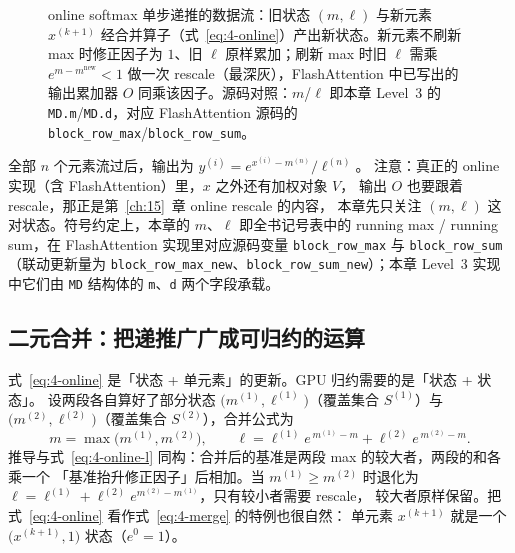 \begin{figure}[htbp]
\caption{online softmax 单步递推的数据流：旧状态 $(m,\ell)$ 与新元素 $x^{(k+1)}$ 经合并算子（式~\ref{eq:4-online}）产出新状态。新元素不刷新 max 时修正因子为 $1$、旧 $\ell$ 原样累加；刷新 max 时旧 $\ell$ 需乘 $e^{m-m^{\mathrm{new}}} < 1$ 做一次 rescale（最深灰），FlashAttention 中已写出的输出累加器 $O$ 同乘该因子。源码对照：$m$/$\ell$ 即本章 Level~3 的 \texttt{MD.m}/\texttt{MD.d}，对应 FlashAttention 源码的 \texttt{block\_row\_max}/\texttt{block\_row\_sum}。}
\label{fig:4-2}
\end{figure}

全部 $n$ 个元素流过后，输出为 $y^{(i)} = e^{x^{(i)} - m^{(n)}} / \ell^{(n)}$。
注意：真正的 online 实现（含 FlashAttention）里，$x$ 之外还有加权对象 $V$，
输出 $O$ 也要跟着 rescale，那正是第~\ref{ch:15}~章 online rescale 的内容，
本章先只关注 $(m, \ell)$ 这对状态。符号约定上，本章的 $m$、$\ell$ 即全书记号表中的
running max / running sum，在 FlashAttention 实现里对应源码变量
\texttt{block\_\allowbreak{}row\_\allowbreak{}max} 与 \texttt{block\_\allowbreak{}row\_\allowbreak{}sum}（联动更新量为
\texttt{block\_\allowbreak{}row\_\allowbreak{}max\_\allowbreak{}new}、\texttt{block\_\allowbreak{}row\_\allowbreak{}sum\_\allowbreak{}new}）；本章 Level~3
实现中它们由 \texttt{MD} 结构体的 \texttt{m}、\texttt{d} 两个字段承载。

\subsection{二元合并：把递推广广成可归约的运算}

式~\ref{eq:4-online} 是「状态 + 单元素」的更新。GPU 归约需要的是「状态 + 状态」。
设两段各自算好了部分状态 $\bigl(m^{(1)}, \ell^{(1)}\bigr)$（覆盖集合
$S^{(1)}$）与 $\bigl(m^{(2)}, \ell^{(2)}\bigr)$（覆盖集合 $S^{(2)}$），合并公式为
\begin{equation}
  m = \max\bigl(m^{(1)}, m^{(2)}\bigr),
  \qquad
  \ell = \ell^{(1)} e^{\,m^{(1)} - m} + \ell^{(2)} e^{\,m^{(2)} - m} .
  \label{eq:4-merge}
\end{equation}
推导与式~\ref{eq:4-online-l} 同构：合并后的基准是两段 max 的较大者，两段的和各乘一个
「基准抬升修正因子」后相加。当 $m^{(1)} \ge m^{(2)}$ 时退化为
$\ell = \ell^{(1)} + \ell^{(2)} e^{m^{(2)} - m^{(1)}}$，只有较小者需要 rescale，
较大者原样保留。把式~\ref{eq:4-online} 看作式~\ref{eq:4-merge} 的特例也很自然：
单元素 $x^{(k+1)}$ 就是一个 $\bigl(x^{(k+1)}, 1\bigr)$ 状态（$e^{0}=1$）。

